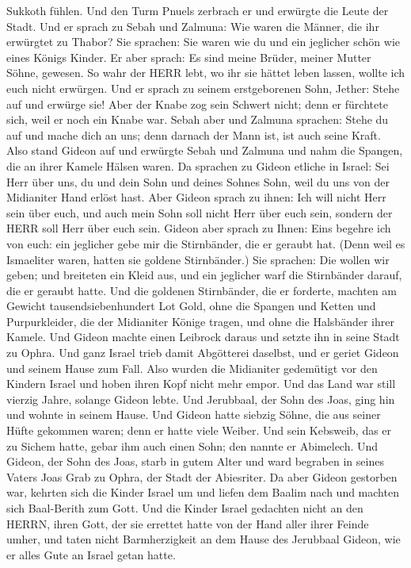 Sukkoth fühlen.  Und den Turm Pnuels zerbrach er und
erwürgte die Leute der Stadt.  Und er sprach zu Sebah und
Zalmuna: Wie waren die Männer, die ihr erwürgtet zu Thabor? Sie
sprachen: Sie waren wie du und ein jeglicher schön wie eines Königs
Kinder.  Er aber sprach: Es sind meine Brüder, meiner
Mutter Söhne, gewesen. So wahr der HERR lebt, wo ihr sie hättet leben
lassen, wollte ich euch nicht erwürgen.  Und er sprach zu
seinem erstgeborenen Sohn, Jether: Stehe auf und erwürge sie! Aber der
Knabe zog sein Schwert nicht; denn er fürchtete sich, weil er noch ein
Knabe war.  Sebah aber und Zalmuna sprachen: Stehe du auf
und mache dich an uns; denn darnach der Mann ist, ist auch seine Kraft.
Also stand Gideon auf und erwürgte Sebah und Zalmuna und nahm die
Spangen, die an ihrer Kamele Hälsen waren.  Da sprachen zu
Gideon etliche in Israel: Sei Herr über uns, du und dein Sohn und deines
Sohnes Sohn, weil du uns von der Midianiter Hand erlöst hast.
 Aber Gideon sprach zu ihnen: Ich will nicht Herr sein über
euch, und auch mein Sohn soll nicht Herr über euch sein, sondern der
HERR soll Herr über euch sein.  Gideon aber sprach zu
Ihnen: Eins begehre ich von euch: ein jeglicher gebe mir die
Stirnbänder, die er geraubt hat. (Denn weil es Ismaeliter waren, hatten
sie goldene Stirnbänder.)  Sie sprachen: Die wollen wir
geben; und breiteten ein Kleid aus, und ein jeglicher warf die
Stirnbänder darauf, die er geraubt hatte.  Und die goldenen
Stirnbänder, die er forderte, machten am Gewicht tausendsiebenhundert
Lot Gold, ohne die Spangen und Ketten und Purpurkleider, die der
Midianiter Könige tragen, und ohne die Halsbänder ihrer Kamele.
 Und Gideon machte einen Leibrock daraus und setzte ihn in
seine Stadt zu Ophra. Und ganz Israel trieb damit Abgötterei daselbst,
und er geriet Gideon und seinem Hause zum Fall.  Also
wurden die Midianiter gedemütigt vor den Kindern Israel und hoben ihren
Kopf nicht mehr empor. Und das Land war still vierzig Jahre, solange
Gideon lebte.  Und Jerubbaal, der Sohn des Joas, ging hin
und wohnte in seinem Hause.  Und Gideon hatte siebzig
Söhne, die aus seiner Hüfte gekommen waren; denn er hatte viele Weiber.
 Und sein Kebsweib, das er zu Sichem hatte, gebar ihm auch
einen Sohn; den nannte er Abimelech.  Und Gideon, der Sohn
des Joas, starb in gutem Alter und ward begraben in seines Vaters Joas
Grab zu Ophra, der Stadt der Abiesriter.  Da aber Gideon
gestorben war, kehrten sich die Kinder Israel um und liefen dem Baalim
nach und machten sich Baal-Berith zum Gott.  Und die Kinder
Israel gedachten nicht an den HERRN, ihren Gott, der sie errettet hatte
von der Hand aller ihrer Feinde umher,  und taten nicht
Barmherzigkeit an dem Hause des Jerubbaal Gideon, wie er alles Gute an
Israel getan hatte.

